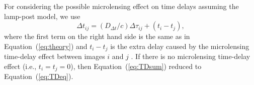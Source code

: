 \documentclass[useAMS,usenatbib]{mnras}
\newcommand{\eref}[1]{Equation~(\ref{#1})}
\newcommand{\Ddt}{D_{\Delta t}}
\begin{document}

For considering the possible microlensing effect on time delays assuming the lamp-post model, we use \begin{equation}
\label{eq:TDsum}
\Delta t_{ij}=(\Ddt/c)\Delta\tau_{ij}+(t_{i}-t_{j}),
\end{equation}
where the first term on the right hand side is the same as in \eref{eq:theory} and $t_{i}-t_{j}$ is the extra delay caused by the microlensing time-delay effect between images $i$ and $j$ \citep[see details in][]{GChenEtal18a}. If there is no microlensing time-delay effect (i.e., $t_{i}=t_{j}=0$), then \eref{eq:TDsum} reduced to \eref{eq:TDeq}.
\end{document}

